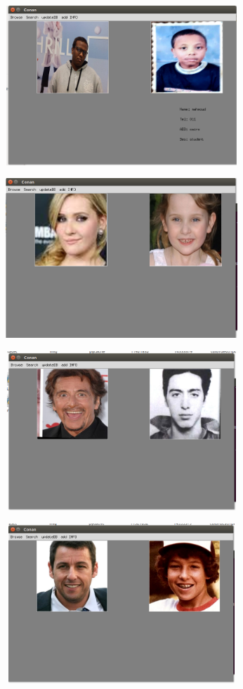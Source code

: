 \documentclass[pdftex,10pt,a4paper,oneside]{article}
\begin{document}
	\begin{figure}[H]
	\centering
	\includegraphics[width=120mm,height=60mm]{fig/16.png}
\end{figure}
	\begin{figure}[H]
	\centering
	\includegraphics[width=120mm,height=60mm]{fig/10.png}
\end{figure}
	\begin{figure}[H]
	\centering
	\includegraphics[width=120mm,height=60mm]{fig/11.png}
\end{figure}
	\begin{figure}[H]
	\centering
	\includegraphics[width=120mm,height=60mm]{fig/12.png}
\end{figure}
\end{document}

